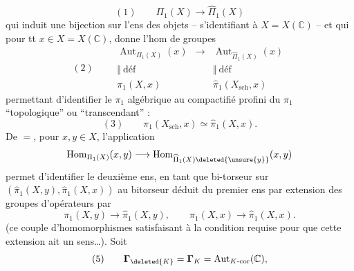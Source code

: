 \[
(1)\qquad\Pi_1(X)\longrightarrow\widehat\Pi_1(X)
\]
qui induit une bijection sur l'ens des objets  -- s'identifiant à $X=X(\mathbb C)$ -- et qui  pour tt $x\in X=X(\mathbb C)$, donne l'hom de groupes
\[
(2)\qquad
\begin{array}{ccc}
\operatorname{Aut}_{\Pi_1(X)}(x)&\longrightarrow&\operatorname{Aut}_{\widehat\Pi_1(X)}(x)\\
\Vert\ \text{déf}&&\Vert\ \text{déf}\\
\pi_1(X,x)&&\widehat\pi_1(X_{\mathrm{sch}},x)
\end{array}
\]
permettant d'identifier le $\pi_1$ algébrique au compactifié profini du $\pi_1$ ``topologique'' ou ``transcendant'' : 
\[
(3)\qquad\pi_1(X_{\mathrm{sch}},x)\simeq\widehat\pi_1(X,x).
\]
De $=$, pour $x,y\in X$, l'application
\[
\operatorname{Hom}_{\Pi_1(X)}(x,y)\longrightarrow\operatorname{Hom}_{\widehat\Pi_1(X)\deleted{\unsure{y}}}(x,y)
\]
permet d'identifier le deuxième ens, en tant que bi-torseur sur $(\widehat\pi_1(X,y),\widehat\pi_1(X,x))$ au bitorseur déduit  du premier ens par extension des groupes d'opérateurs par
\[
\pi_1(X,y)\longrightarrow\widehat\pi_1(X,y),\qquad\pi_1(X,x)\longrightarrow\widehat\pi_1(X,x).
\]
(ce couple d'homomorphismes satisfaisant  à la condition requise pour que cette extension ait un sens\ldots).
Soit
\[
(5)\qquad\mathbf{\Gamma}_{\deleted{K}}=\mathbf{\Gamma}_K=\operatorname{Aut}_{K\text{-cor}}(\mathbb C),
\]

